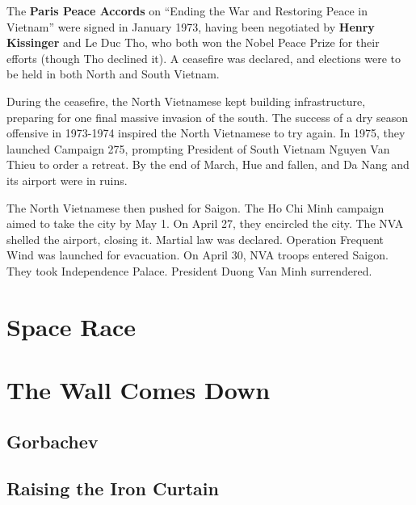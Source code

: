 The \textbf{Paris Peace Accords} on ``Ending the War and Restoring Peace in Vietnam'' were signed in January 1973,
having been negotiated by \textbf{Henry Kissinger} and Le Duc Tho,
who both won the Nobel Peace Prize for their efforts (though Tho declined it).
A ceasefire was declared, and elections were to be held in both North and South Vietnam.

During the ceasefire, the North Vietnamese kept building infrastructure,
preparing for one final massive invasion of the south.
The success of a dry season offensive in 1973-1974 inspired the North Vietnamese to try again.
In 1975, they launched Campaign 275, prompting President of South Vietnam Nguyen Van Thieu to order a retreat.
By the end of March, Hue and fallen, and Da Nang and its airport were in ruins.

The North Vietnamese then pushed for Saigon.
The Ho Chi Minh campaign aimed to take the city by May 1.
On April 27, they encircled the city.
The NVA shelled the airport, closing it.
Martial law was declared.
Operation Frequent Wind was launched for evacuation.
On April 30, NVA troops entered Saigon.
They took Independence Palace.
President Duong Van Minh surrendered.

\section{Space Race}

\section{The Wall Comes Down}

\subsection*{Gorbachev}

\subsection*{Raising the Iron Curtain}

